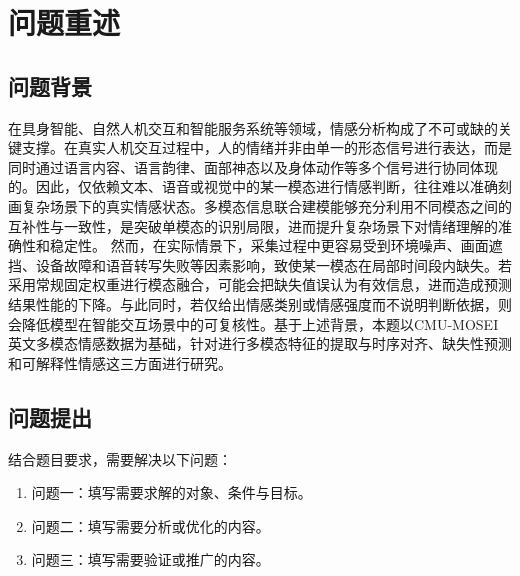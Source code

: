\section{问题重述}
\subsection{问题背景}
在具身智能、自然人机交互和智能服务系统等领域，情感分析构成了不可或缺的关键支撑。在真实人机交互过程中，人的情绪并非由单一的形态信号进行表达，而是同时通过语言内容、语言韵律、面部神态以及身体动作等多个信号进行协同体现的。因此，仅依赖文本、语音或视觉中的某一模态进行情感判断，往往难以准确刻画复杂场景下的真实情感状态。多模态信息联合建模能够充分利用不同模态之间的互补性与一致性，是突破单模态的识别局限，进而提升复杂场景下对情绪理解的准确性和稳定性。
然而，在实际情景下，采集过程中更容易受到环境噪声、画面遮挡、设备故障和语音转写失败等因素影响，致使某一模态在局部时间段内缺失。若采用常规固定权重进行模态融合，可能会把缺失值误认为有效信息，进而造成预测结果性能的下降。与此同时，若仅给出情感类别或情感强度而不说明判断依据，则会降低模型在智能交互场景中的可复核性。基于上述背景，本题以CMU-MOSEI英文多模态情感数据为基础，针对进行多模态特征的提取与时序对齐、缺失性预测和可解释性情感这三方面进行研究。
\subsection{问题提出}
结合题目要求，需要解决以下问题：
\begin{enumerate}
  \item 问题一：填写需要求解的对象、条件与目标。
  \item 问题二：填写需要分析或优化的内容。
  \item 问题三：填写需要验证或推广的内容。
\end{enumerate}
